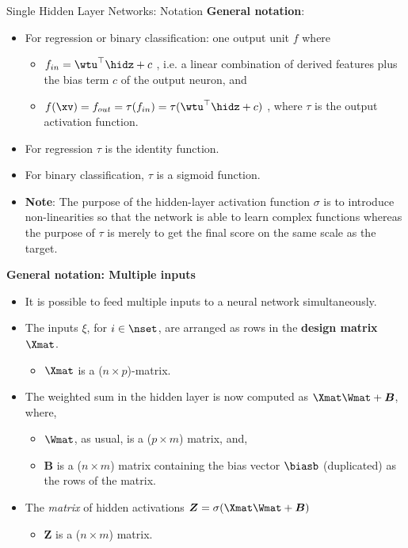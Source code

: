 \begin{vbframe}{Single Hidden Layer Networks: Notation}
  \textbf{General notation}:
  \begin{itemize}
    \vspace{4mm}
    \item For regression or binary classification: one output unit $f$ where
      \begin{itemize}
        \item $f_{in} = \wtu^\top \hidz + c$ , i.e. a linear combination of derived features plus the bias term $c$ of the output neuron, and
        \vspace{2mm}
        \item $f(\xv)= f_{out} = \tau(f_{in}) = \tau(\wtu^\top \hidz + c)$ , where $\tau$ is the output activation function.
      \end{itemize}
    \item For regression $\tau$ is the identity function.
    \item For binary classification, $\tau$ is a sigmoid function.
    \item \textbf{Note}: The purpose of the hidden-layer activation function $\sigma$ is to introduce non-linearities so that the network is able to learn complex functions whereas the purpose of $\tau$ is merely to get the final score on the same scale as the target.
  \end{itemize}

\framebreak 

  \textbf{General notation: Multiple inputs}
  \begin{itemize}
    \item It is possible to feed multiple inputs to a neural network simultaneously.
    \vspace{2mm}
    \item The inputs $\xi$, for $i \in \nset$, are arranged as rows in the \textbf{design matrix} $\Xmat$.
    \begin{itemize}
      \item $\Xmat$ is a ($n \times p$)-matrix.
    \end{itemize}
    \vspace{2mm}
    \item The weighted sum in the hidden layer is now computed as $\Xmat\Wmat + \bm{B}$, where,
      \begin{itemize}
        \item $\Wmat$, as usual, is a ($p \times m$) matrix, and,
        \vspace{2mm}
        \item $\bm{B}$ is a ($n \times m$) matrix containing the bias vector $\biasb$ (duplicated) as the rows of the matrix.
      \end{itemize}
    \vspace{2mm}
    \item The \textit{matrix} of hidden activations $\bm{Z} = \sigma(\Xmat\Wmat + \bm{B})$
    \begin{itemize}
      \item $\bm{Z}$ is a ($n \times m$) matrix.
    \end{itemize}
  \end{itemize}


\end{vbframe}
